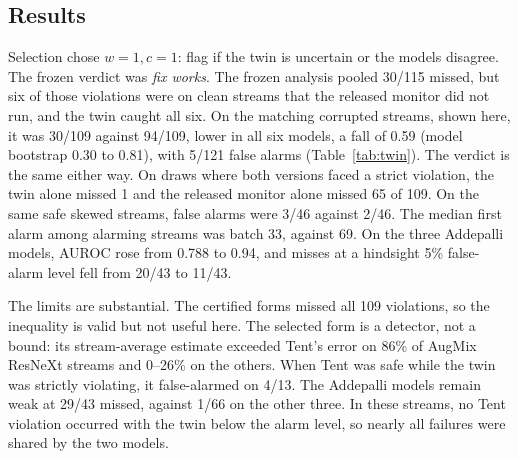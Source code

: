 \documentclass[runningheads]{llncs}
\begin{document}
\subsection{Results}
Selection chose $w=1,c=1$: flag if the twin is uncertain or the models disagree. The frozen verdict was \emph{fix works}. The frozen analysis pooled 30/115 missed, but six of those violations were on clean streams that the released monitor did not run, and the twin caught all six. On the matching corrupted streams, shown here, it was 30/109 against 94/109, lower in all six models, a fall of 0.59 (model bootstrap 0.30 to 0.81), with 5/121 false alarms (Table~\ref{tab:twin}). The verdict is the same either way. On draws where both versions faced a strict violation, the twin alone missed 1 and the released monitor alone missed 65 of 109. On the same safe skewed streams, false alarms were 3/46 against 2/46. The median first alarm among alarming streams was batch 33, against 69. On the three Addepalli models, AUROC rose from 0.788 to 0.94, and misses at a hindsight 5\% false-alarm level fell from 20/43 to 11/43.

The limits are substantial. The certified forms missed all 109 violations, so the inequality is valid but not useful here. The selected form is a detector, not a bound: its stream-average estimate exceeded Tent's error on 86\% of AugMix ResNeXt streams and 0--26\% on the others. When Tent was safe while the twin was strictly violating, it false-alarmed on 4/13. The Addepalli models remain weak at 29/43 missed, against 1/66 on the other three. In these streams, no Tent violation occurred with the twin below the alarm level, so nearly all failures were shared by the two models.

\begin{table}[t]
\caption{Held-out missed violations per checkpoint. The twin rule was selected on development corruptions. Certified form: $w=0$.}
\label{tab:twin}
\centering\footnotesize\setlength{\tabcolsep}{5pt}
\end{table}
\end{document}
